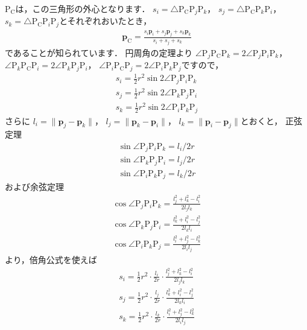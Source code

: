 ﻿\documentclass[a4paper]{jsarticle}
\begin{document}
$\mathrm{P}_{\mathrm{C}}$は，この三角形の外心となります．
$s_{i}=\triangle\mathrm{P}_{\mathrm{C}}\mathrm{P}_{j}\mathrm{P}_{k}$，
$s_{j}=\triangle\mathrm{P}_{\mathrm{C}}\mathrm{P}_{k}\mathrm{P}_{i}$，
$s_{k}=\triangle\mathrm{P}_{\mathrm{C}}\mathrm{P}_{i}\mathrm{P}_{j}$とそれぞれおいたとき，
\begin{align*}
\boldsymbol{p}_{\mathrm{C}}=\frac{s_{i}\boldsymbol{p}_{i}+s_{j}\boldsymbol{p}_{j}+s_{k}\boldsymbol{p}_{k}}{s_{i}+s_{j}+s_{k}}
\end{align*}
であることが知られています．
円周角の定理より
$\angle\mathrm{P}_{j}\mathrm{P}_{\mathrm{C}}\mathrm{P}_{k}=2\angle\mathrm{P}_{j}\mathrm{P}_{i}\mathrm{P}_{k}$，
$\angle\mathrm{P}_{k}\mathrm{P}_{\mathrm{C}}\mathrm{P}_{i}=2\angle\mathrm{P}_{k}\mathrm{P}_{j}\mathrm{P}_{i}$，
$\angle\mathrm{P}_{i}\mathrm{P}_{\mathrm{C}}\mathrm{P}_{j}=2\angle\mathrm{P}_{i}\mathrm{P}_{k}\mathrm{P}_{j}$ですので，
\begin{align*}
s_{i}=\frac{1}{2}r^{2}\sin 2\angle\mathrm{P}_{j}\mathrm{P}_{i}\mathrm{P}_{k}
\\
s_{j}=\frac{1}{2}r^{2}\sin 2\angle\mathrm{P}_{k}\mathrm{P}_{j}\mathrm{P}_{i}
\\
s_{k}=\frac{1}{2}r^{2}\sin 2\angle\mathrm{P}_{i}\mathrm{P}_{k}\mathrm{P}_{j}
\end{align*}
さらに
$l_{i}=\|\boldsymbol{p}_{j}-\boldsymbol{p}_{k}\|$，
$l_{j}=\|\boldsymbol{p}_{k}-\boldsymbol{p}_{i}\|$，
$l_{k}=\|\boldsymbol{p}_{i}-\boldsymbol{p}_{j}\|$とおくと，
正弦定理
\begin{align*}
\sin\angle\mathrm{P}_{j}\mathrm{P}_{i}\mathrm{P}_{k}=l_{i}/2r
\\
\sin\angle\mathrm{P}_{k}\mathrm{P}_{j}\mathrm{P}_{i}=l_{j}/2r
\\
\sin\angle\mathrm{P}_{i}\mathrm{P}_{k}\mathrm{P}_{j}=l_{k}/2r
\end{align*}
および余弦定理
\begin{align*}
\cos\angle\mathrm{P}_{j}\mathrm{P}_{i}\mathrm{P}_{k}=\frac{l_{j}^{2}+l_{k}^{2}-l_{i}^{2}}{2l_{j}l_{k}}
\\
\cos\angle\mathrm{P}_{k}\mathrm{P}_{j}\mathrm{P}_{i}=\frac{l_{k}^{2}+l_{i}^{2}-l_{j}^{2}}{2l_{k}l_{i}}
\\
\cos\angle\mathrm{P}_{i}\mathrm{P}_{k}\mathrm{P}_{j}=\frac{l_{i}^{2}+l_{j}^{2}-l_{k}^{2}}{2l_{i}l_{j}}
\end{align*}
より，倍角公式を使えば
\begin{align*}
s_{i}=\frac{1}{2}r^{2}\cdot\frac{l_{i}}{2r}\cdot\frac{l_{j}^{2}+l_{k}^{2}-l_{i}^{2}}{2l_{j}l_{k}}
\\
s_{j}=\frac{1}{2}r^{2}\cdot\frac{l_{j}}{2r}\cdot\frac{l_{k}^{2}+l_{i}^{2}-l_{j}^{2}}{2l_{k}l_{i}}
\\
s_{k}=\frac{1}{2}r^{2}\cdot\frac{l_{k}}{2r}\cdot\frac{l_{i}^{2}+l_{j}^{2}-l_{k}^{2}}{2l_{i}l_{j}}
\end{align*}
\end{document}
